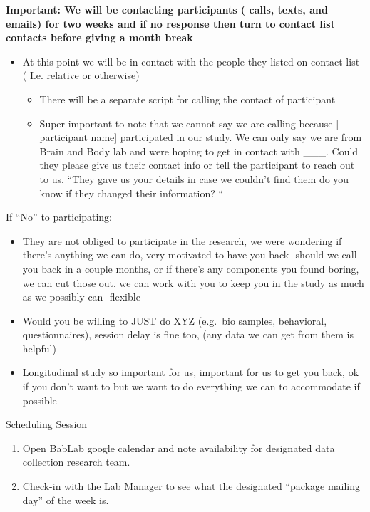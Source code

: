 \documentclass[]{book}
\providecommand{\tightlist}{%
  \setlength{\itemsep}{0pt}\setlength{\parskip}{0pt}}
\begin{document}
\textbf{Important: We will be contacting participants ( calls, texts, and emails) for two weeks and if no response then turn to contact list contacts before giving a month break}

\begin{itemize}
\tightlist
\item
  At this point we will be in contact with the people they listed on contact list ( I.e. relative or otherwise)

  \begin{itemize}
  \tightlist
  \item
    There will be a separate script for calling the contact of participant
  \item
    Super important to note that we cannot say we are calling because {[} participant name{]} participated in our study. We can only say we are from Brain and Body lab and were hoping to get in contact with \_\_\_. Could they please give us their contact info or tell the participant to reach out to us. ``They gave us your details in case we couldn't find them do you know if they changed their information? ``
  \end{itemize}
\end{itemize}

If ``No'' to participating:

\begin{itemize}
\tightlist
\item
  They are not obliged to participate in the research, we were wondering if there's anything we can do, very motivated to have you back- should we call you back in a couple months, or if there's any components you found boring, we can cut those out. we can work with you to keep you in the study as much as we possibly can- flexible\\
\item
  Would you be willing to JUST do XYZ (e.g.~bio samples, behavioral, questionnaires), session delay is fine too, (any data we can get from them is helpful)
\item
  Longitudinal study so important for us, important for us to get you back, ok if you don't want to but we want to do everything we can to accommodate if possible
\end{itemize}

Scheduling Session

\begin{enumerate}
\def\labelenumi{\arabic{enumi}.}
\tightlist
\item
  Open BabLab google calendar and note availability for designated data collection research team.
\item
  Check-in with the Lab Manager to see what the designated ``package mailing day'' of the week is.
\end{enumerate}
\end{document}
